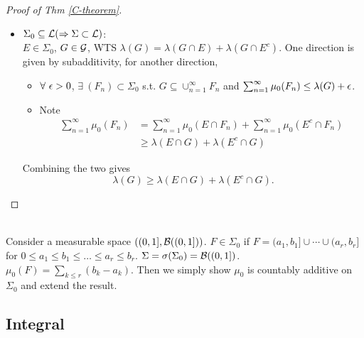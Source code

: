 \begin{proof}[Proof of Thm \ref{C-theorem}]
\begin{enumerate}[label = (\alph*)]
\begin{itemize}
     \item $\Sigma_0 \subseteq \mathcal{L} (\Rightarrow \Sigma \subset \mathcal{L})$:\\
     $E \in \Sigma_0$, $G \in \mathcal{G}$, WTS $\lambda(G) = \lambda(G\cap E) + \lambda(G \cap E^c)$. One direction is given by subadditivity, for another direction, 
     \begin{itemize}
         \item $\forall\ \epsilon > 0$, $\exists\ (F_n) \subset \Sigma_0$ s.t. $G \subseteq \cup_{n=1}^\infty F_n$ and  $\sum_{n = 1}^\infty \mu_0 (F_n) \leq \lambda(G) + \epsilon$. 
         \item Note
         \begin{align*}
             \sum_{n = 1}^\infty \mu_0(F_n) &= \sum_{n = 1}^\infty \mu_0(E \cap F_n) + \sum_{n=1}^\infty \mu_0 (E^c \cap F_n)\\
             &\geq \lambda(E \cap G) + \lambda(E^c \cap G)
         \end{align*}
     \end{itemize}
     Combining the two gives
     \begin{equation*}
         \lambda(G) \geq \lambda(E \cap G) + \lambda(E^c \cap G).
     \end{equation*}
 \end{itemize}
 \end{enumerate}
\end{proof}


\vspace{3pt}
\begin{corollary}\ \\
Consider a measurable space $((0,1], \mathcal{B}((0,1]))$.  $F \in \Sigma_0$ if $F = (a_1,b_1] \cup \cdots \cup (a_r,b_r]$ for $0 \leq a_1 \leq b_1\leq\dots\leq a_r\leq b_r$. $\Sigma = \sigma(\Sigma_0) = \mathcal{B}((0,1])$. $\mu_0 (F) = \sum_{k \leq r} (b_k - a_k)$. Then we simply show $\mu_0$ is countably additive on $\Sigma_0$ and extend the result. 
\end{corollary}

\vspace{12pt}
\subsection{Integral}

